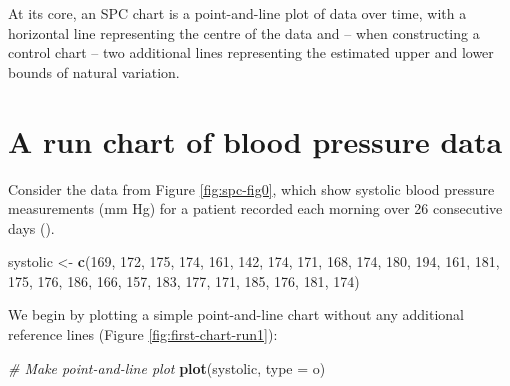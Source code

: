 \documentclass[
]{book}
\newenvironment{Shaded}{\begin{snugshade}}{\end{snugshade}}
\newcommand{\AttributeTok}[1]{\textcolor[rgb]{0.13,0.29,0.53}{#1}}
\newcommand{\CommentTok}[1]{\textcolor[rgb]{0.56,0.35,0.01}{\textit{#1}}}
\newcommand{\DecValTok}[1]{\textcolor[rgb]{0.00,0.00,0.81}{#1}}
\newcommand{\FunctionTok}[1]{\textcolor[rgb]{0.13,0.29,0.53}{\textbf{#1}}}
\newcommand{\NormalTok}[1]{#1}
\newcommand{\OtherTok}[1]{\textcolor[rgb]{0.56,0.35,0.01}{#1}}
\newcommand{\StringTok}[1]{\textcolor[rgb]{0.31,0.60,0.02}{#1}}
\begin{document}
At its core, an SPC chart is a point-and-line plot of data over time, with a horizontal line representing the centre of the data and -- when constructing a control chart -- two additional lines representing the estimated upper and lower bounds of natural variation.

\section{A run chart of blood pressure data}\label{a-run-chart-of-blood-pressure-data}

Consider the data from Figure \ref{fig:spc-fig0}, which show systolic blood pressure measurements (mm Hg) for a patient recorded each morning over 26 consecutive days ().

\begin{Shaded}
\begin{Highlighting}[]
\NormalTok{systolic }\OtherTok{\textless{}{-}} \FunctionTok{c}\NormalTok{(}\DecValTok{169}\NormalTok{, }\DecValTok{172}\NormalTok{, }\DecValTok{175}\NormalTok{, }\DecValTok{174}\NormalTok{, }\DecValTok{161}\NormalTok{, }\DecValTok{142}\NormalTok{,}
              \DecValTok{174}\NormalTok{, }\DecValTok{171}\NormalTok{, }\DecValTok{168}\NormalTok{, }\DecValTok{174}\NormalTok{, }\DecValTok{180}\NormalTok{, }\DecValTok{194}\NormalTok{,}
              \DecValTok{161}\NormalTok{, }\DecValTok{181}\NormalTok{, }\DecValTok{175}\NormalTok{, }\DecValTok{176}\NormalTok{, }\DecValTok{186}\NormalTok{, }\DecValTok{166}\NormalTok{,}
              \DecValTok{157}\NormalTok{, }\DecValTok{183}\NormalTok{, }\DecValTok{177}\NormalTok{, }\DecValTok{171}\NormalTok{, }\DecValTok{185}\NormalTok{, }\DecValTok{176}\NormalTok{,}
              \DecValTok{181}\NormalTok{, }\DecValTok{174}\NormalTok{)}
\end{Highlighting}
\end{Shaded}

We begin by plotting a simple point-and-line chart without any additional reference lines (Figure \ref{fig:first-chart-run1}):

\begin{Shaded}
\begin{Highlighting}[]
\CommentTok{\# Make point{-}and{-}line plot}
\FunctionTok{plot}\NormalTok{(systolic, }\AttributeTok{type =} \StringTok{\textquotesingle{}o\textquotesingle{}}\NormalTok{)}
\end{Highlighting}
\end{Shaded}
\end{document}
